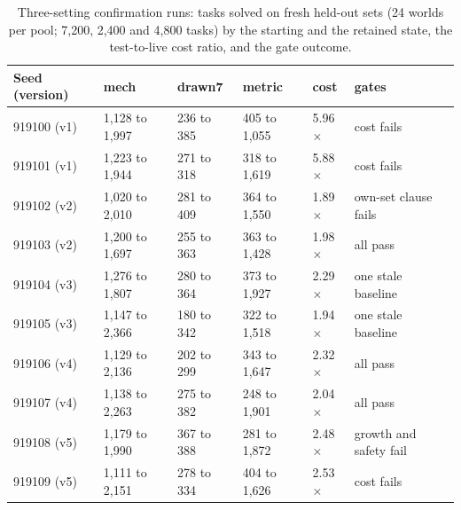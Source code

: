 \documentclass[11pt]{article}
\begin{document}
\begin{table}[t]
\centering
\caption{Three-setting confirmation runs: tasks solved on fresh held-out sets (24 worlds per pool; 7,200, 2,400 and 4,800 tasks) by the starting and the retained state, the test-to-live cost ratio, and the gate outcome.}
\label{tab:confirm}
\footnotesize
\begin{tabular}{llllll}
\toprule
Seed (version) & mech & drawn7 & metric & cost & gates \\
\midrule
919100 (v1) & 1,128 to 1,997 & 236 to 385 & 405 to 1,055 & 5.96$\times$ & cost fails \\
919101 (v1) & 1,223 to 1,944 & 271 to 318 & 318 to 1,619 & 5.88$\times$ & cost fails \\
919102 (v2) & 1,020 to 2,010 & 281 to 409 & 364 to 1,550 & 1.89$\times$ & own-set clause fails \\
919103 (v2) & 1,200 to 1,697 & 255 to 363 & 363 to 1,428 & 1.98$\times$ & all pass \\
919104 (v3) & 1,276 to 1,807 & 280 to 364 & 373 to 1,927 & 2.29$\times$ & one stale baseline \\
919105 (v3) & 1,147 to 2,366 & 180 to 342 & 322 to 1,518 & 1.94$\times$ & one stale baseline \\
919106 (v4) & 1,129 to 2,136 & 202 to 299 & 343 to 1,647 & 2.32$\times$ & all pass \\
919107 (v4) & 1,138 to 2,263 & 275 to 382 & 248 to 1,901 & 2.04$\times$ & all pass \\
919108 (v5) & 1,179 to 1,990 & 367 to 388 & 281 to 1,872 & 2.48$\times$ & growth and safety fail \\
919109 (v5) & 1,111 to 2,151 & 278 to 334 & 404 to 1,626 & 2.53$\times$ & cost fails \\
\bottomrule
\end{tabular}
\end{table}
\end{document}
